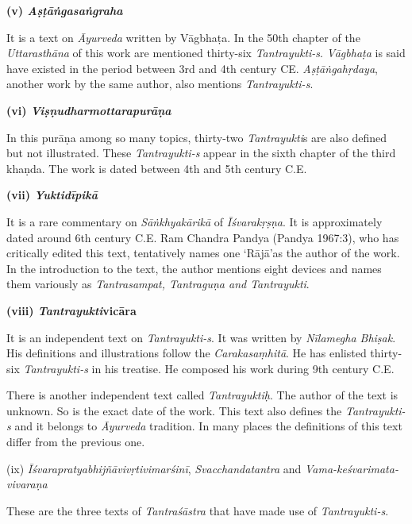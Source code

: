 \vskip 2pt

\textbf{(v) \textit{Aṣṭāṅgasaṅgraha}}

It is a text on \textit{Āyurveda} written by Vāgbhaṭa. In the 50th chapter of the \textit{Uttarasthāna} of this work are mentioned thirty-six \textit{Tantrayukti-s}. \textit{Vāgbhaṭa} is said have existed in the period between 3rd and 4th century CE. \textit{Aṣṭāṅgahṛdaya}, another work by the same author, also mentions \textit{Tantrayukti-s}.

\vskip 2pt

\textbf{(vi) \textit{Viṣṇudharmottarapurāṇa}}

In this purāṇa among so many topics, thirty-two \textit{Tantrayukti}s are also defined but not illustrated. These \textit{Tantrayukti-s} appear in the sixth chapter of the third khaṇda. The work is dated between 4th and 5th century C.E.

\vskip 2pt

\textbf{(vii) \textit{Yuktidīpikā}}

It is a rare commentary on \textit{Sāṅkhyakārikā} of \textit{Īśvarakṛṣṇa}. It is approximately dated around 6th century C.E. Ram Chandra Pandya (Pandya 1967:3), who has critically edited this text, tentatively names one ‘Rājā’as the author of the work. In the introduction to the text, the author mentions eight devices and names them variously as \textit{Tantrasampat, Tantraguṇa and Tantrayukti}.

\vskip 2pt

\textbf{(viii) \textit{Tantrayukti}vicāra}

It is an independent text on \textit{Tantrayukti-s}. It was written by \textit{Nīlamegha Bhiṣak}. His definitions and illustrations follow the \textit{Carakasaṃhitā}. He has enlisted thirty-six \textit{Tantrayukti-s} in his treatise. He composed his work during 9th century C.E.

There is another independent text called \textit{Tantrayuktiḥ}. The author of the text is unknown. So is the exact date of the work. This text also defines the \textit{Tantrayukti-s} and it belongs to \textit{Āyurveda} tradition. In many places the definitions of this text differ from the previous one. 

\vskip 2pt

(ix) \textit{Īśvarapratyabhijñāvivṛtivimarśinī}, \textit{Svacchandatantra} and \textit{Vama-keśva\-rimata-vivaraṇa}

These are the three texts of \textit{Tantraśāstra} that have made use of \textit{Tantrayukti-s}.

